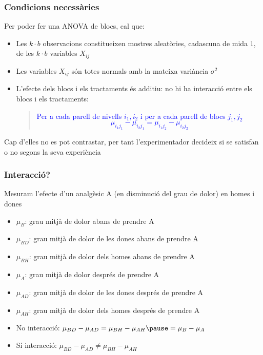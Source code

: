 \documentclass[12pt,t]{beamer}
\newcommand{\blue}[1]{\textcolor{blue}{#1}}
\renewcommand{\emph}[1]{{\color{red}#1}}
\theoremstyle{plain}
\theoremstyle{definition}
\begin{document}
\begin{frame}
\frametitle{Condicions necessàries}

Per poder fer una ANOVA de blocs, cal que:\medskip

\begin{itemize}

\item Les $k\cdot b$ observacions constitueixen mostres aleatòries, cadascuna de mida $1$, de les $k\cdot b$ variables $X_{ij}$
\smallskip

\item Les variables $X_{ij}$ són totes normals amb la mateixa variància $\sigma^2$
\smallskip

\item L'efecte dels blocs i els tractaments és \emph{additiu}: no hi ha \emph{interacció} entre els blocs i els tractaments:\vspace*{1ex}

\begin{quote} 
\blue{Per a cada parell de nivells $i_1,i_2$ i per a cada parell de blocs $j_1,j_2$ \vspace*{-1ex}
$$
\mu_{i_1j_1}-\mu_{i_2j_1}=\mu_{i_1j_2}-\mu_{i_2j_2}
$$}
\end{quote} 
\end{itemize}\vspace*{-5ex}

Cap d'elles no es pot contrastar, per tant l'experimentador decideix si se satisfan o no segons la seva experiència
\end{frame}


\begin{frame}
\frametitle{Interacció?}


Mesuram l'efecte d'un analgèsic A (en disminució del grau de dolor) en homes i dones 
\begin{itemize}
\item $\mu_B$: grau mitjà de dolor abans de prendre A 

\item $\mu_{BD}$: grau mitjà de dolor de les dones abans de prendre A 


\item $\mu_{BH}$: grau mitjà de dolor dels homes abans de prendre A 

\item $\mu_A$: grau mitjà de dolor després  de prendre A 

\item $\mu_{AD}$: grau mitjà de dolor de les dones després de prendre A 


\item $\mu_{AH}$: grau mitjà de dolor dels homes després  de prendre A
\end{itemize}\pause
\begin{itemize}
\item \emph{No interacció:} $\mu_{BD}-\mu_{AD}=\mu_{BH}-\mu_{AH}\pause =\mu_{B}-\mu_A$\pause\smallskip

\item \emph{Sí interacció:} $\mu_{BD}-\mu_{AD}\neq \mu_{BH}-\mu_{AH}$
\end{itemize}

\end{frame}
\end{document}

